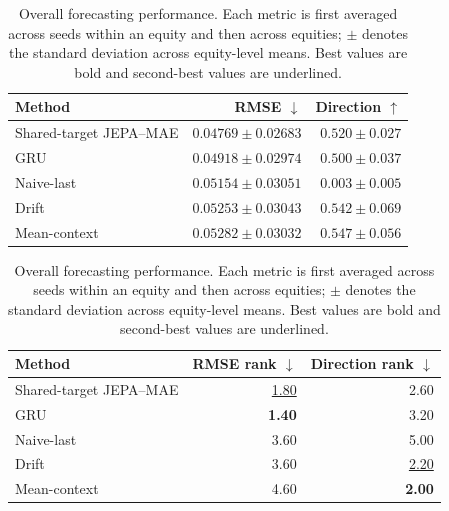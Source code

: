 \begin{table}[t]
\centering
\small
\caption{Overall forecasting performance. Each metric is first averaged across seeds within an equity and then across equities; $\pm$ denotes the standard deviation across equity-level means. Best values are bold and second-best values are underlined.}
\label{tab:main_metrics}
\begin{tabular}{lrr}
\toprule
Method & RMSE $\downarrow$ & Direction $\uparrow$ \\
\midrule
Shared-target JEPA--MAE & \textbf{$0.04769 \pm 0.02683$} & $0.520 \pm 0.027$ \\
GRU & \underline{$0.04918 \pm 0.02974$} & $0.500 \pm 0.037$ \\
Naive-last & $0.05154 \pm 0.03051$ & $0.003 \pm 0.005$ \\
Drift & $0.05253 \pm 0.03043$ & \underline{$0.542 \pm 0.069$} \\
Mean-context & $0.05282 \pm 0.03032$ & \textbf{$0.547 \pm 0.056$} \\
\bottomrule
\end{tabular}
\par\medskip
\begin{tabular}{lrr}
\toprule
Method & RMSE rank $\downarrow$ & Direction rank $\downarrow$ \\
\midrule
Shared-target JEPA--MAE & \underline{1.80} & 2.60 \\
GRU & \textbf{1.40} & 3.20 \\
Naive-last & 3.60 & 5.00 \\
Drift & 3.60 & \underline{2.20} \\
Mean-context & 4.60 & \textbf{2.00} \\
\bottomrule
\end{tabular}
\end{table}
